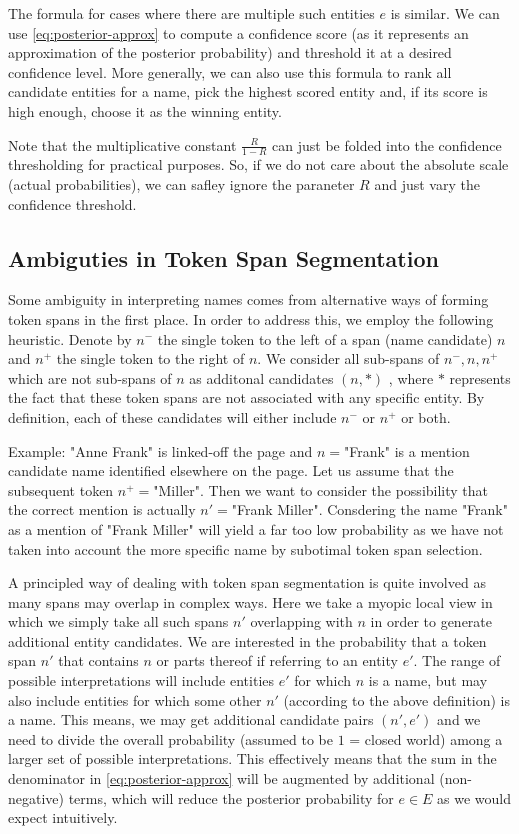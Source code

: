 \documentclass{article}
\begin{document}
The formula for cases where there are multiple such entities $e$ is similar. We can use \eqref{eq:posterior-approx} to compute a confidence score (as it represents an approximation of the posterior probability) and threshold it at a desired confidence level. More generally, we can also use this formula to rank all candidate entities for a name, pick the highest scored entity and, if its score is high enough, choose it as the winning entity.

Note that the multiplicative constant $\frac{R}{1-R}$ can just be folded into the confidence thresholding for practical purposes. So, if we do not care about the absolute scale (actual probabilities), we can safley ignore the paraneter $R$ and just vary the confidence threshold. 


\subsection*{Ambiguties in Token Span Segmentation}

Some ambiguity in interpreting names comes from alternative ways of forming token spans in the first place. In order to address this, we employ the following heuristic. Denote by $n^-$ the single token to the left of a span (name candidate) $n$ and $n^+$ the single token to the right of $n$. We consider all sub-spans of $n^-,n,n^+$ which are not sub-spans of $n$ as additonal candidates $(n,*)$ 
, where $*$ represents the fact that these token spans are not associated with any specific entity. By definition, each of these candidates will either include $n^-$ or $n^+$ or both. 

 Example: "Anne Frank" is linked-off the page and $n=$"Frank" is a mention candidate name identified elsewhere on the page. Let us assume that the subsequent token $n^+=$"Miller". Then we want to consider the possibility that the correct mention is actually $n'=$"Frank Miller". Consdering the name "Frank" as a mention of "Frank Miller" will yield a far too low probability as we have not taken into account the more specific name by subotimal token span selection. 
 
A principled way of dealing with token span segmentation is quite involved as many spans may overlap in complex ways. Here we take a myopic local view in which we simply take all such spans $n'$ overlapping with $n$ in order to generate additional entity candidates. We are interested in the probability that a token span $n'$ that contains $n$ or parts thereof if referring to an entity $e'$. The range of possible interpretations will include entities $e'$ for which $n$ is a name, but may also include entities for which some other $n'$ (according to the above definition) is a name. This means, we may get additional candidate pairs $(n',e')$ and we need to divide the overall probability (assumed to be $1$ = closed world) among a larger set of possible interpretations. This effectively means that the sum in the denominator in \eqref{eq:posterior-approx} will be augmented by additional (non-negative) terms, which will reduce the posterior probability for $e \in E$ as we would expect intuitively.  
\end{document}
